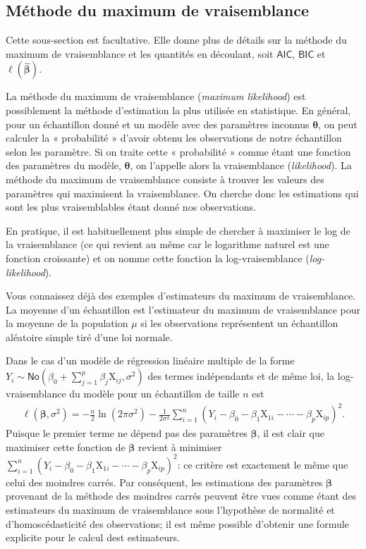 \documentclass[
  11pt,
  letterpaper,
]{scrbook}
\theoremstyle{definition}
\theoremstyle{remark}
\begin{document}
\subsection{Méthode du maximum de
vraisemblance}\label{muxe9thode-du-maximum-de-vraisemblance}

Cette sous-section est facultative. Elle donne plus de détails sur la
méthode du maximum de vraisemblance et les quantités en découlant, soit
\(\mathsf{AIC}\), \(\mathsf{BIC}\) et
\(\ell(\widehat{\boldsymbol{\beta}})\).

La méthode du maximum de vraisemblance (\emph{maximum likelihood}) est
possiblement la méthode d'estimation la plus utilisée en statistique. En
général, pour un échantillon donné et un modèle avec des paramètres
inconnus \(\boldsymbol{\theta}\), on peut calculer la « probabilité »
d'avoir obtenu les observations de notre échantillon selon les
paramètre. Si on traite cette « probabilité » comme étant une fonction
des paramètres du modèle, \(\boldsymbol{\theta}\), on l'appelle alors la
vraisemblance (\emph{likelihood}). La méthode du maximum de
vraisemblance consiste à trouver les valeurs des paramètres qui
maximisent la vraisemblance. On cherche donc les estimations qui sont
les plus vraisemblables étant donné nos observations.

En pratique, il est habituellement plus simple de chercher à maximiser
le log de la vraisemblance (ce qui revient au même car le logarithme
naturel est une fonction croissante) et on nomme cette fonction la
log-vraisemblance (\emph{log-likelihood}).

Vous connaissez déjà des exemples d'estimateurs du maximum de
vraisemblance. La moyenne d'un échantillon est l'estimateur du maximum
de vraisemblance pour la moyenne de la population \(\mu\) si les
observations représentent un échantillon aléatoire simple tiré d'une loi
normale.

Dans le cas d'un modèle de régression linéaire multiple de la forme
\(Y_i \sim \mathsf{No}(\beta_0 + \sum_{j=1}^p \beta_j\mathrm{X}_{ij}, \sigma^2)\)
des termes indépendants et de même loi, la log-vraisemblance du modèle
pour un échantillon de taille \(n\) est \begin{align*}
 \ell(\boldsymbol{\beta}, \sigma^2) =- \frac{n}{2} \ln(2\pi\sigma^2) - \frac{1}{2\sigma^2}\sum_{i=1}^n (Y_i- \beta_0 - \beta_1 \mathrm{X}_{1i} - \cdots - \beta_p\mathrm{X}_{ip})^2.
\end{align*} Puisque le premier terme ne dépend pas des paramètres
\(\boldsymbol{\beta}\), il est clair que maximiser cette fonction de
\(\boldsymbol{\beta}\) revient à minimiser
\(\sum_{i=1}^n (Y_i- \beta_0 - \beta_1 \mathrm{X}_{1i} - \cdots - \beta_p\mathrm{X}_{ip})^2\):
ce critère est exactement le même que celui des moindres carrés. Par
conséquent, les estimations des paramètres \(\boldsymbol{\beta}\)
provenant de la méthode des moindres carrés peuvent être vues comme
étant des estimateurs du maximum de vraisemblance sous l'hypothèse de
normalité et d'homoscédasticité des observations; il est même possible
d'obtenir une formule explicite pour le calcul dest estimateurs.
\end{document}
